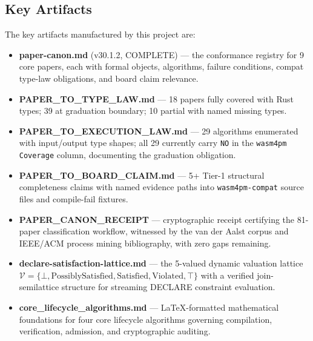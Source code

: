 \subsection{Key Artifacts}
\label{sec:sources-papers-identity-artifacts}

The key artifacts manufactured by this project are:

\begin{itemize}
  \item \textbf{paper-canon.md} (v30.1.2, COMPLETE) --- the conformance
    registry for 9 core papers, each with formal objects, algorithms, failure
    conditions, compat type-law obligations, and board claim relevance.
  \item \textbf{PAPER\_TO\_TYPE\_LAW.md} --- 18 papers fully covered with Rust
    types; 39 at graduation boundary; 10 partial with named missing types.
  \item \textbf{PAPER\_TO\_EXECUTION\_LAW.md} --- 29 algorithms enumerated
    with input/output type shapes; all 29 currently carry \texttt{NO} in the
    \texttt{wasm4pm Coverage} column, documenting the graduation obligation.
  \item \textbf{PAPER\_TO\_BOARD\_CLAIM.md} --- 5+ Tier-1 structural
    completeness claims with named evidence paths into \texttt{wasm4pm-compat}
    source files and compile-fail fixtures.
  \item \textbf{PAPER\_CANON\_RECEIPT} --- cryptographic receipt certifying
    the 81-paper classification workflow, witnessed by the van der Aalst corpus
    and IEEE/ACM process mining bibliography, with zero gaps remaining.
  \item \textbf{declare-satisfaction-lattice.md} --- the 5-valued dynamic
    valuation lattice $\mathcal{V} = \{\bot, \text{PossiblySatisfied},
    \text{Satisfied}, \text{Violated}, \top\}$ with a verified join-semilattice
    structure for streaming DECLARE constraint evaluation.
  \item \textbf{core\_lifecycle\_algorithms.md} --- LaTeX-formatted mathematical
    foundations for four core lifecycle algorithms governing compilation,
    verification, admission, and cryptographic auditing.
\end{itemize}
